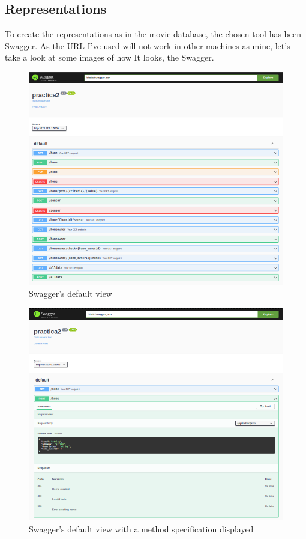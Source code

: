\documentclass[a4paper,12pt]{article}
\begin{document}
\subsection*{Representations}
To create the representations as in the movie database, the chosen tool has been Swagger.
As the URL I've used will not work in other machines as mine, let's take a look at some images of how It looks, the Swagger.
\begin{figure}[H]
    \centering
    \includegraphics[scale = 0.5]{images/Swagger default.png}
    \caption{Swagger's default view}
    \label{fig:my_label}
\end{figure}
\begin{figure}[H]
    \centering
    \includegraphics[scale = 0.5]{images/Swagger deffault amb menu desplegat.png}
    \caption{Swagger's default view with a method specification displayed}
    \label{fig:my_label}
\end{figure}
\end{document}
